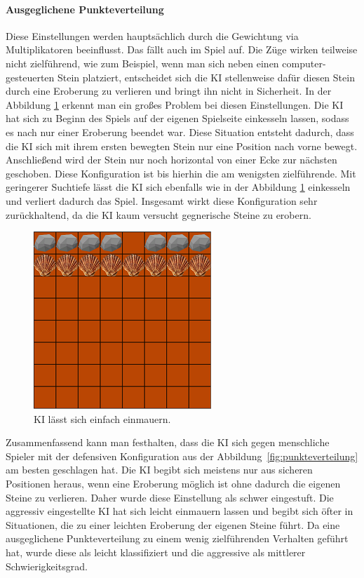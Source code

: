 \paragraph{Ausgeglichene Punkteverteilung}
Diese Einstellungen werden hauptsächlich durch die Gewichtung via Multiplikatoren beeinflusst. Das fällt auch im Spiel auf. Die Züge wirken teilweise nicht zielführend, wie zum Beispiel, wenn man sich neben einen computer-gesteuerten Stein platziert, entscheidet sich die KI stellenweise dafür diesen Stein durch eine Eroberung zu verlieren und bringt ihn nicht in Sicherheit. In der Abbildung \ref{fig:humaneingekesselt} erkennt man ein großes Problem bei diesen Einstellungen. Die KI hat sich zu Beginn des Spiels auf der eigenen Spielseite einkesseln lassen, sodass es nach nur einer Eroberung beendet war. Diese Situation entsteht dadurch, dass die KI sich mit ihrem ersten bewegten Stein nur eine Position nach vorne bewegt. Anschließend wird der Stein nur noch horizontal von einer Ecke zur nächsten geschoben. Diese Konfiguration ist bis hierhin die am wenigsten zielführende. Mit geringerer Suchtiefe lässt die KI sich ebenfalls wie in der Abbildung \ref{fig:humaneingekesselt} einkesseln und verliert dadurch das Spiel. Insgesamt wirkt diese Konfiguration sehr zurückhaltend, da die KI kaum versucht gegnerische Steine zu erobern.
\begin{figure}[h]
	\centering
	\includegraphics{img/both/humaneingekesselt}	
	\caption{KI lässt sich einfach einmauern.}
	\label{fig:humaneingekesselt}
\end{figure}

\par Zusammenfassend kann man festhalten, dass die KI sich gegen menschliche Spieler mit der defensiven Konfiguration aus der Abbildung~\ref{fig:punkteverteilung} am besten geschlagen hat. Die KI begibt sich meistens nur aus sicheren Positionen heraus, wenn eine Eroberung möglich ist ohne dadurch die eigenen Steine zu verlieren. Daher wurde diese Einstellung als schwer eingestuft. Die aggressiv eingestellte KI hat sich leicht einmauern lassen und begibt sich öfter in Situationen, die zu einer leichten Eroberung der eigenen Steine führt. Da eine ausgeglichene Punkteverteilung zu einem wenig zielführenden Verhalten geführt hat, wurde diese als leicht klassifiziert und die aggressive als mittlerer Schwierigkeitsgrad.


